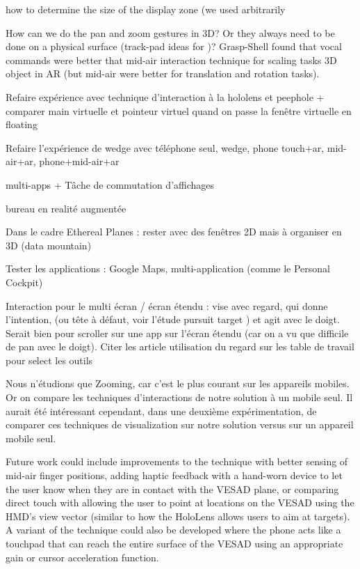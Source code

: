 how to determine the size of the display zone (we used arbitrarily 

How can we do the pan and zoom gestures in 3D? Or they always need to be done on a physical surface (track-pad ideas for )? Grasp-Shell found that vocal commands were better that mid-air interaction technique for scaling tasks 3D object in AR (but mid-air were better for translation and rotation tasks).

Refaire expérience avec technique d'interaction à la hololens et peephole + comparer main virtuelle et pointeur virtuel quand on passe la fenêtre virtuelle en floating

Refaire l'expérience de wedge avec téléphone seul, wedge, phone touch+ar, mid-air+ar, phone+mid-air+ar

multi-apps + Tâche de commutation d'affichages

bureau en realité augmentée

Dans le cadre Ethereal Planes : rester avec des fenêtres 2D mais à organiser en 3D (data mountain)

Tester les applications : Google Maps, multi-application (comme le Personal Cockpit)

Interaction pour le multi écran / écran étendu : vise avec regard, qui donne l'intention, (ou tête à défaut, voir l'étude pursuit target \citep{Esteves2017}) et agit avec le doigt. Serait bien pour scroller sur une app sur l'écran étendu (car on a vu que difficile de pan avec le doigt). Citer les article utilisation du regard sur les table de travail pour select les outils

Nous n'étudions que Zooming, car c'est le plus courant sur les appareils mobiles. Or on compare les techniques d'interactions de notre solution à un mobile seul. Il aurait été intéressant cependant, dans une deuxième expérimentation, de comparer ces techniques de visualization sur notre solution versus sur un appareil mobile seul.

Future work could include improvements to the  technique with better sensing of mid-air finger positions, adding haptic feedback
with a hand-worn device to let the user know when they are in contact with the VESAD plane, or comparing direct touch with allowing the user to point at locations on the VESAD using the HMD's view vector (similar to how the HoloLens allows users to aim at targets). A variant of the  technique could also be developed where the phone acts like a touchpad that can reach the entire surface of the VESAD using an appropriate gain or cursor acceleration function.

